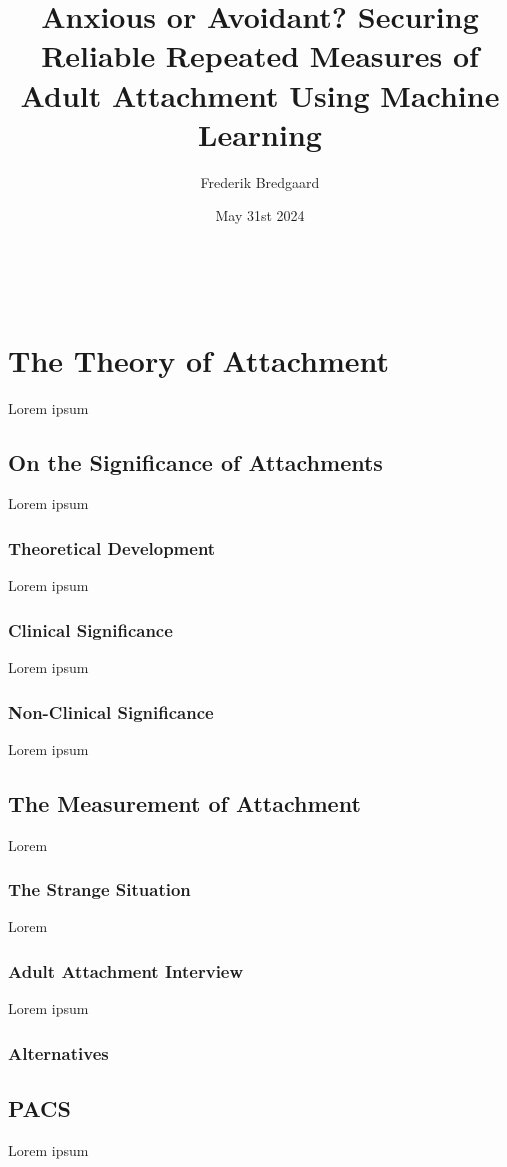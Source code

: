 \documentclass[12pt]{report}
\title{Anxious or Avoidant? Securing Reliable Repeated Measures of Adult Attachment Using Machine Learning}
\author{Frederik Bredgaard}
\date{May 31st 2024}
\begin{document}
\maketitle
\
\tableofcontents

\chapter{The Theory of Attachment}
Lorem ipsum

\section{On the Significance of Attachments}
Lorem ipsum

\subsection{Theoretical Development}
Lorem ipsum

\subsection{Clinical Significance}
Lorem ipsum

\subsection{Non-Clinical Significance}
Lorem ipsum

\section{The Measurement of Attachment}
Lorem

\subsection{The Strange Situation}
Lorem

\subsection{Adult Attachment Interview}
Lorem ipsum

\subsection{Alternatives}

\section{PACS}
Lorem ipsum \cite{Talia2017,Talia2020}
\end{document}
